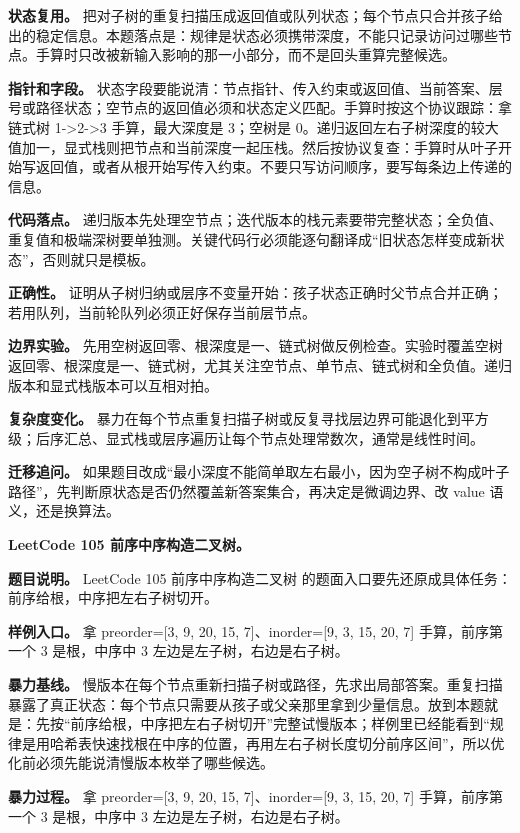 \textbf{状态复用。} 把对子树的重复扫描压成返回值或队列状态；每个节点只合并孩子给出的稳定信息。本题落点是：规律是状态必须携带深度，不能只记录访问过哪些节点。手算时只改被新输入影响的那一小部分，而不是回头重算完整候选。

\textbf{指针和字段。} 状态字段要能说清：节点指针、传入约束或返回值、当前答案、层号或路径状态；空节点的返回值必须和状态定义匹配。手算时按这个协议跟踪：拿链式树 1->2->3 手算，最大深度是 3；空树是 0。递归返回左右子树深度的较大值加一，显式栈则把节点和当前深度一起压栈。然后按协议复查：手算时从叶子开始写返回值，或者从根开始写传入约束。不要只写访问顺序，要写每条边上传递的信息。

\textbf{代码落点。} 递归版本先处理空节点；迭代版本的栈元素要带完整状态；全负值、重复值和极端深树要单独测。关键代码行必须能逐句翻译成“旧状态怎样变成新状态”，否则就只是模板。

\textbf{正确性。} 证明从子树归纳或层序不变量开始：孩子状态正确时父节点合并正确；若用队列，当前轮队列必须正好保存当前层节点。

\textbf{边界实验。} 先用空树返回零、根深度是一、链式树做反例检查。实验时覆盖空树返回零、根深度是一、链式树，尤其关注空节点、单节点、链式树和全负值。递归版本和显式栈版本可以互相对拍。

\textbf{复杂度变化。} 暴力在每个节点重复扫描子树或反复寻找层边界可能退化到平方级；后序汇总、显式栈或层序遍历让每个节点处理常数次，通常是线性时间。

\textbf{迁移追问。} 如果题目改成“最小深度不能简单取左右最小，因为空子树不构成叶子路径”，先判断原状态是否仍然覆盖新答案集合，再决定是微调边界、改 value 语义，还是换算法。

\noindent\textbf{LeetCode 105 前序中序构造二叉树。}

\textbf{题目说明。} LeetCode 105 前序中序构造二叉树 的题面入口要先还原成具体任务：前序给根，中序把左右子树切开。

\textbf{样例入口。} 拿 preorder=[3, 9, 20, 15, 7]、inorder=[9, 3, 15, 20, 7] 手算，前序第一个 3 是根，中序中 3 左边是左子树，右边是右子树。

\textbf{暴力基线。} 慢版本在每个节点重新扫描子树或路径，先求出局部答案。重复扫描暴露了真正状态：每个节点只需要从孩子或父亲那里拿到少量信息。放到本题就是：先按“前序给根，中序把左右子树切开”完整试慢版本；样例里已经能看到“规律是用哈希表快速找根在中序的位置，再用左右子树长度切分前序区间”，所以优化前必须先能说清慢版本枚举了哪些候选。

\textbf{暴力过程。} 拿 preorder=[3, 9, 20, 15, 7]、inorder=[9, 3, 15, 20, 7] 手算，前序第一个 3 是根，中序中 3 左边是左子树，右边是右子树。

